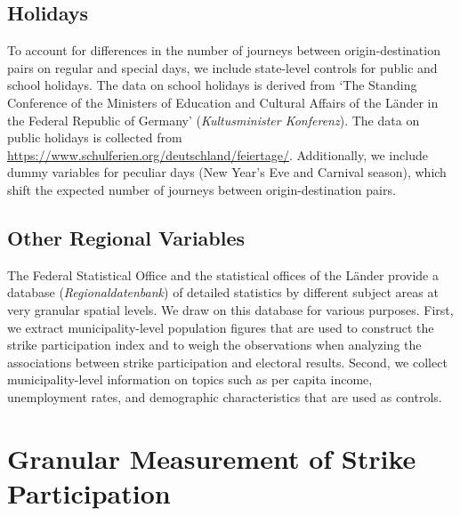 \subsection{Holidays}
To account for differences in the number of journeys between origin-destination pairs on regular and special days, we include state-level controls for public and school holidays. The data on school holidays is derived from `The Standing Conference of the Ministers of Education and Cultural Affairs of the Länder in the Federal Republic of Germany' (\textit{Kultusminister Konferenz}). The data on public holidays is collected from \url{https://www.schulferien.org/deutschland/feiertage/}. Additionally, we include dummy variables for peculiar days (New Year's Eve and Carnival season), which shift the expected number of journeys between origin-destination pairs.







\subsection{Other Regional Variables}
The Federal Statistical Office and the statistical offices of the Länder provide a database (\textit{Regionaldatenbank}) of detailed statistics by different subject areas at very granular spatial levels. We draw on this database for various purposes. First, we extract municipality-level population figures that are used to construct the strike participation index and to weigh the observations when analyzing the associations between strike participation and electoral results. Second, we collect municipality-level information on topics such as per capita income, unemployment rates, and demographic characteristics that are used as controls.










\clearpage
\section{Granular Measurement of Strike Participation}\label{sec_greta_cons:measurement_strike_participation}


